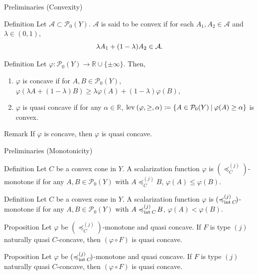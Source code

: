 \documentclass[aspectratio=169, dvipdfmx, 11pt]{beamer}
\newcommand{\RealNumberSet}{\mathbb{R}}
\newcommand{\Interior}[1]{\text{\rm int\:${#1}$}} %
\newcommand{\OrderingLevelSets}[3]{\text{\rm lev\:$({#1}, {#2}, {#3})$}} %
\newcommand{\pow}[1]{\mathcal{P}_{0}(#1)}
\newcommand{\SetForm}[2]{
  \{{#1}\:|\:{#2}\}
}
\newcommand{\setrel}[2]{\preccurlyeq^{(#1)}_{#2}\!}
\begin{document}
\begin{frame}{Preliminaries (Convexity)}
  \begin{block}{Definition \cite{MR3458699}}
    Let $\mathcal{A} \subset \pow{Y}$. $\mathcal{A}$ is said to be convex if for each $A_1, A_2 \in \mathcal{A}$ and $\lambda \in (0,1)$,
    \begin{equation}
      \lambda A_1 + (1-\lambda) A_2 \in \mathcal{A}. \notag
    \end{equation}
  \end{block}

  \begin{block}{Definition \cite{MR3458699}}
    Let $\varphi \colon \pow{Y} \to \RealNumberSet \cup \{\pm \infty\}$. Then,
    \begin{enumerate}
      \item $\varphi$ is concave if for $A, B \in \pow{Y}$,
            $\varphi(\lambda A + (1-\lambda) B) \geq  \lambda \varphi (A) + (1- \lambda) \varphi (B)$,
      \item $\varphi$ is quasi concave if for any $\alpha \in \RealNumberSet$,
            $\OrderingLevelSets{\varphi}{\geq}{\alpha} \coloneqq \SetForm{A \in \pow{Y}}{\varphi(A) \geq \alpha}$ is convex.
    \end{enumerate}
  \end{block}

  \begin{alertblock}{Remark}
    If $\varphi$ is concave, then $\varphi$ is quasi concave.
  \end{alertblock}
\end{frame}

\begin{frame}{Preliminaries (Monotonicity)}
  \begin{block}{Definition}
    Let $C$ be a convex cone in $Y$.
    A scalarization function $\varphi$ is $(\setrel{j}{C})$-monotone if
    for any $A, B \in \pow{Y}$ with
    $A \setrel{j}{C} B$, $\varphi (A) \leq \varphi (B)$.
  \end{block}

  \begin{block}{Definition}
    Let $C$ be a convex cone in $Y$.
    A scalarization function $\varphi$ is $(\setrel{j}{\Interior{C}})$-monotone if
    for any $A, B \in \pow{Y}$ with
    $A \setrel{j}{\Interior{C}} B$, $\varphi (A) < \varphi (B)$.
  \end{block}

  \begin{block}{Proposition}
    Let $\varphi$ be $(\setrel{j}{C})$-monotone and quasi concave.
    If $F$ is type $(j)$ naturally quasi $C$-concave,
    then $(\varphi \circ F)$ is quasi concave.
  \end{block}

  \begin{block}{Proposition}
    Let $\varphi$ be $(\setrel{j}{\Interior{C}})$-monotone and quasi concave.
    If $F$ is type $(j)$ naturally quasi $C$-concave,
    then $(\varphi \circ F)$ is quasi concave.
  \end{block}
\end{frame}
\end{document}
